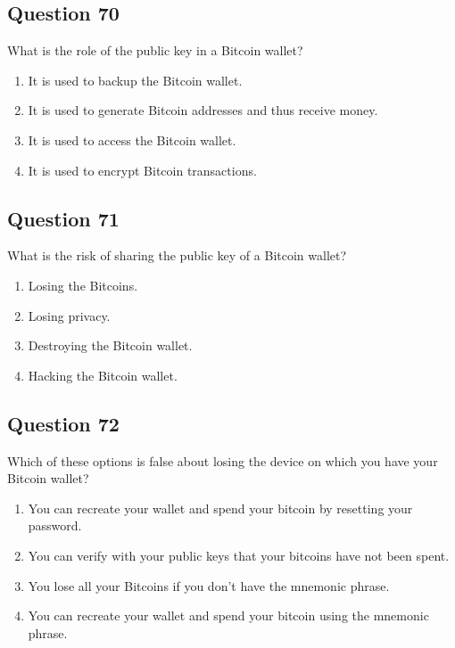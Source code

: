 \documentclass[12pt,a4paper]{article}
\begin{document}
\bigskip


\subsection*{Question 70}
What is the role of the public key in a Bitcoin wallet?

\begin{enumerate}[label=\Alph*., leftmargin=*]
\item It is used to backup the Bitcoin wallet.
\item It is used to generate Bitcoin addresses and thus receive money.
\item It is used to access the Bitcoin wallet.
\item It is used to encrypt Bitcoin transactions.
\end{enumerate}

\bigskip


\subsection*{Question 71}
What is the risk of sharing the public key of a Bitcoin wallet?

\begin{enumerate}[label=\Alph*., leftmargin=*]
\item Losing the Bitcoins.
\item Losing privacy.
\item Destroying the Bitcoin wallet.
\item Hacking the Bitcoin wallet.
\end{enumerate}

\bigskip


\subsection*{Question 72}
Which of these options is false about losing the device on which you have your Bitcoin wallet?

\begin{enumerate}[label=\Alph*., leftmargin=*]
\item You can recreate your wallet and spend your bitcoin by resetting your password.
\item You can verify with your public keys that your bitcoins have not been spent.
\item You lose all your Bitcoins if you don't have the mnemonic phrase.
\item You can recreate your wallet and spend your bitcoin using the mnemonic phrase.
\end{enumerate}
\end{document}
